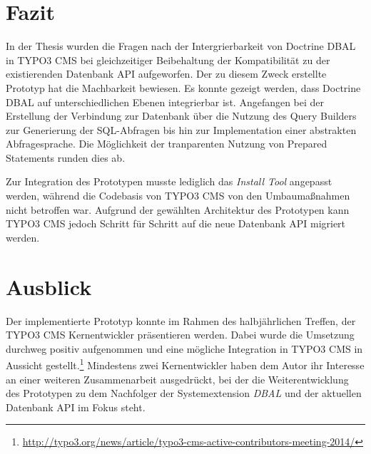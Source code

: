 \begingroup
\let\clearpage\relax
\let\cleardoublepage\relax
\let\cleardoublepage\relax

\chapter*{Fazit}
\label{ch:conclusion}
In der Thesis wurden die Fragen nach der Intergrierbarkeit von Doctrine DBAL in TYPO3 CMS bei gleichzeitiger Beibehaltung der Kompatibilität zu der existierenden Datenbank API aufgeworfen. Der zu diesem Zweck erstellte Prototyp hat die Machbarkeit bewiesen. Es konnte gezeigt werden, dass Doctrine DBAL auf unterschiedlichen Ebenen integrierbar ist. Angefangen bei der Erstellung der Verbindung zur Datenbank über die Nutzung des Query Builders zur Generierung der SQL-Abfragen bis hin zur Implementation einer abstrakten Abfragesprache. Die Möglichkeit der tranparenten Nutzung von Prepared Statements runden dies ab.

Zur Integration des Prototypen musste lediglich das \textit{Install Tool} angepasst werden, während die Codebasis von TYPO3 CMS von den Umbaumaßnahmen nicht betroffen war. Aufgrund der gewählten Architektur des Prototypen kann TYPO3 CMS jedoch Schritt für Schritt auf die neue Datenbank API migriert werden.

\vfill

\chapter{Ausblick}
\label{ch:outlook}
Der implementierte Prototyp konnte im Rahmen des halbjährlichen Treffen, der TYPO3 CMS Kernentwickler präsentieren werden. Dabei wurde die Umsetzung durchweg positiv aufgenommen und eine mögliche Integration in TYPO3 CMS in Aussicht gestellt.\footnote{\url{http://typo3.org/news/article/typo3-cms-active-contributors-meeting-2014/}} Mindestens zwei Kernentwickler haben dem Autor ihr Interesse an einer weiteren Zusammenarbeit ausgedrückt, bei der die Weiterentwicklung des Prototypen zu dem Nachfolger der Systemextension \textit{DBAL} und der aktuellen Datenbank API im Fokus steht.

\endgroup
\vfill
